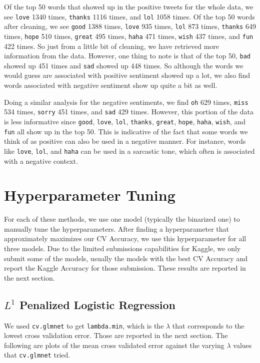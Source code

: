 \documentclass{article}
\begin{document}
Of the top 50 words that showed up in the positive tweets for the whole data, we see \texttt{love} 1340 times, \texttt{thanks} 1116 times, and \texttt{lol} 1058 times. Of the top 50 words after cleaning, we see \texttt{good} 1388 times, \texttt{love} 935 times, \texttt{lol} 873 times, \texttt{thanks} 649 times, \texttt{hope} 510 times, \texttt{great} 495 times, \texttt{haha} 471 times, \texttt{wish} 437 times, and \texttt{fun} 422 times. So just from a little bit of cleaning, we have retrieved more information from the data. However, one thing to note is that of the top 50, \texttt{bad} showed up 451 times and \texttt{sad} showed up 448 times. So although the words we would guess are associated with positive sentiment showed up a lot, we also find words associated with negative sentiment show up quite a bit as well.

Doing a similar analysis for the negative sentiments, we find \texttt{oh} 629 times, \texttt{miss} 534 times, \texttt{sorry} 451 times, and \texttt{sad} 429 times. However, this portion of the data is less informative since \texttt{good}, \texttt{love}, \texttt{lol}, \texttt{thanks}, \texttt{great}, \texttt{hope}, \texttt{haha}, \texttt{wish}, and \texttt{fun} all show up in the top 50. This is indicative of the fact that some words we think of as positive can also be used in a negative manner. For instance, words like \texttt{love}, \texttt{lol}, and \texttt{haha} can be used in a sarcastic tone, which often is associated with a negative context.


\section{Hyperparameter Tuning}
For each of these methods, we use one model (typically the binarized one) to manually tune the hyperparameters. After finding a hyperparameter that approximately maximizes our CV Accuracy, we use this hyperparameter for all three models. Due to the limited submissions capabilities for Kaggle, we only submit some of the models, usually the models with the best CV Accuracy and report the Kaggle Accuracy for those submission. These results are reported in the next section. 

\subsection{$L^1$ Penalized Logistic Regression}
We used \texttt{cv.glmnet} to get \texttt{lambda.min}, which is the $\lambda$ that corresponds to the lowest cross validation error. Those are reported in the next section. The following are plots of the mean cross validated error against the varying $\lambda$ values that \texttt{cv.glmnet} tried. \\
\end{document}
